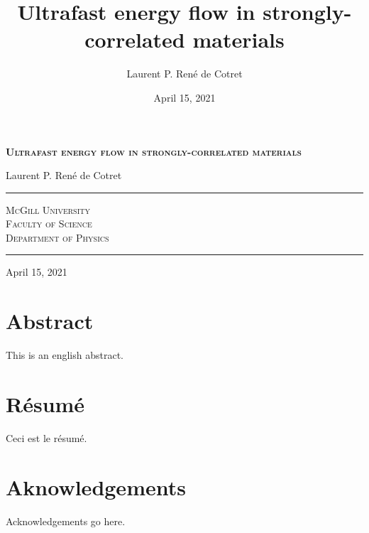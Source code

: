 \documentclass[
  11pt,
  canadian,
  a4paper,
  open=right,
  twoside=true,
  cleardoublepage=empty,
  clearpage=empty]{scrbook}
\title{Ultrafast energy flow in strongly-correlated materials}
\author{Laurent P. René de Cotret}
\date{April 15, 2021}
\renewcommand{\maketitle}{
\thispagestyle{empty}

\parindent=0pt

\begin{center}
    \LARGE
    \textbf{\textsc{ Ultrafast energy flow in strongly-correlated materials }}
\end{center}

\begin{center}
    \Large
    Laurent P. René de Cotret
\end{center}

\vspace{20mm}
\hrule
\vspace{5mm}

\begin{center}
    \Large
    \textsc{
        McGill University\\
        Faculty of Science\\
        Department of Physics
    }
\end{center}

\vspace{5mm}
\hrule
\vspace{10mm}


\vfill

\vspace{\baselineskip}\noindent
\begin{center}
    \large
    April 15, 2021
\end{center}
}
\begin{document}
\frontmatter
\maketitle





\cleardoublepage
\begin{minipage}{\linewidth}

\chapter*{Abstract}
This is an english abstract.


\newpage
\chapter*{Résumé}
Ceci est le résumé.

\end{minipage}
\cleardoublepage



\chapter*{Aknowledgements}
Acknowledgements go here.


\cleardoublepage


{
\hypersetup{linkcolor=}
\setcounter{tocdepth}{2}
\tableofcontents
}
\mainmatter
\listoffigures
\end{document}
